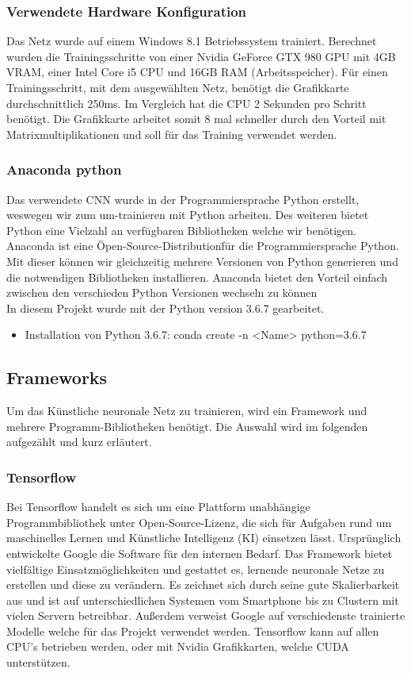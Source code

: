 \documentclass[a4paper,12pt,oneside]{article}
\begin{document}
  \subsubsection{Verwendete Hardware Konfiguration}
Das Netz wurde auf einem Windows 8.1 Betriebssystem trainiert. Berechnet wurden die Trainingsschritte von einer Nvidia GeForce GTX 980 GPU mit 4GB VRAM, einer Intel Core i5 CPU und 16GB RAM (Arbeitsspeicher). Für einen Trainingsschritt, mit dem ausgewählten Netz, benötigt die Grafikkarte durchschnittlich 250ms. Im Vergleich hat die CPU 2 Sekunden pro Schritt benötigt. Die Grafikkarte arbeitet somit 8 mal schneller durch den Vorteil mit Matrixmultiplikationen und soll für das Training verwendet werden.

  \subsubsection{Anaconda python}
Das verwendete CNN wurde in der Programmiersprache Python erstellt, weswegen wir zum um-trainieren mit Python arbeiten. Des weiteren bietet Python eine Vielzahl an verfügbaren Bibliotheken welche wir benötigen. Anaconda ist eine \"Open-Source-Distribution\" für die Programmiersprache Python. Mit dieser können wir gleichzeitig mehrere Versionen von Python generieren und die notwendigen Bibliotheken installieren. Anaconda bietet den Vorteil einfach zwischen den verschieden Python Versionen wechseln zu können \\
In diesem Projekt wurde mit der Python version 3.6.7 gearbeitet.

  \begin{itemize}
	\item Installation von Python 3.6.7: conda create -n <Name> python=3.6.7
  \end{itemize}
  
  \subsection{Frameworks}
Um das Künstliche neuronale Netz zu trainieren, wird ein Framework und mehrere Programm-Bibliotheken benötigt. Die Auswahl wird im folgenden aufgezählt und kurz erläutert.
 
  \subsubsection{Tensorflow}
Bei Tensorflow handelt es sich um eine Plattform unabhängige Programmbibliothek unter Open-Source-Lizenz, die sich für Aufgaben rund um maschinelles Lernen und Künstliche Intelligenz (KI) einsetzen lässt. Ursprünglich entwickelte Google die Software für den internen Bedarf. Das Framework bietet vielfältige Einsatzmöglichkeiten und gestattet es, lernende neuronale Netze zu erstellen und diese zu verändern. Es zeichnet sich durch seine gute Skalierbarkeit aus und ist auf unterschiedlichen Systemen vom Smartphone bis zu Clustern mit vielen Servern betreibbar. Außerdem verweist Google auf verschiedenste trainierte Modelle welche für das Projekt verwendet werden. Tensorflow kann auf allen CPU's betrieben werden, oder mit Nvidia Grafikkarten, welche CUDA unterstützen.
\end{document}
